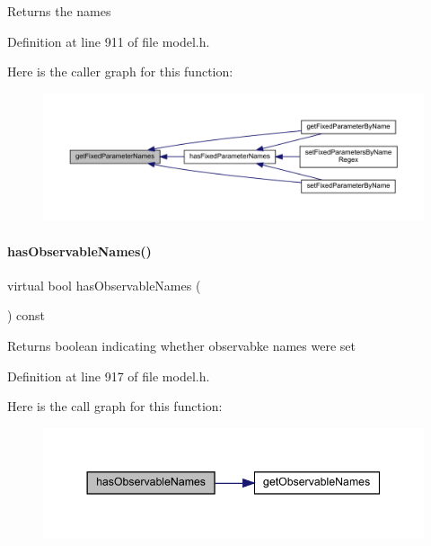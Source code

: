 \begin{DoxyReturn}{Returns}
the names 
\end{DoxyReturn}


Definition at line 911 of file model.\+h.

Here is the caller graph for this function\+:
\nopagebreak
\begin{figure}[H]
\begin{center}
\leavevmode
\includegraphics[width=350pt]{classamici_1_1_model_a40260fd33966dc70d0edfa21bf655012_icgraph}
\end{center}
\end{figure}
\mbox{\label{classamici_1_1_model_aa7b808394713a29e59c434dd7f6a23ac}} 
\paragraph{\texorpdfstring{has\+Observable\+Names()}{hasObservableNames()}}
{\footnotesize\ttfamily virtual bool has\+Observable\+Names (\begin{DoxyParamCaption}{ }\end{DoxyParamCaption}) const\hspace{0.3cm}{\ttfamily [virtual]}}

\begin{DoxyReturn}{Returns}
boolean indicating whether observabke names were set 
\end{DoxyReturn}


Definition at line 917 of file model.\+h.

Here is the call graph for this function\+:
\nopagebreak
\begin{figure}[H]
\begin{center}
\leavevmode
\includegraphics[width=344pt]{classamici_1_1_model_aa7b808394713a29e59c434dd7f6a23ac_cgraph}
\end{center}
\end{figure}
\mbox{\label{classamici_1_1_model_a32b4a0c822a696e388aaa8284bf08059}} 
